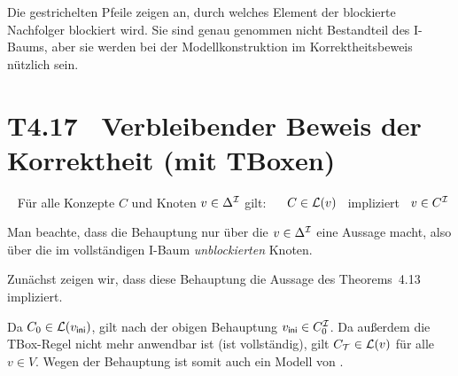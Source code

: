 \documentclass[fontsize=11pt, twoside=false, numbers=autoenddot]{scrbook}
\begin{document}
Die gestrichelten Pfeile zeigen an, durch welches Element der blockierte Nachfolger
blockiert wird.
Sie sind genau genommen nicht Bestandteil des I-Baums, aber sie werden
bei der Modellkonstruktion im Korrektheitsbeweis nützlich sein.

\section*{T4.17~ Verbleibender Beweis der Korrektheit (mit TBoxen)}

~
Für alle Konzepte $C$ und Knoten $v \in \Delta^\mathcal{I}$ gilt:
~~
$C \in \mathcal{L}(v)$
~impliziert~
$v \in C^\mathcal{I}$

\parII
Man beachte, dass die Behauptung nur über die $v \in \Delta^\mathcal{I}$
eine Aussage macht, also über die im vollständigen I-Baum \Bmc \emph{unblockierten} Knoten.

\par\medskip
Zunächst zeigen wir, dass diese Behauptung die Aussage
des Theorems~4.13 impliziert.

Da $C_0 \in \mathcal{L}(v_{\textsf{ini}})$,
gilt nach der obigen Behauptung $v_{\textsf{ini}} \in C_0^\mathcal{I}$.
Da außerdem die TBox-Regel nicht mehr anwendbar ist (\Bmc ist vollständig),
gilt $C_\mathcal{T} \in \mathcal{L}(v)$ für alle $v \in V$.
Wegen der Behauptung ist somit \Imc auch ein Modell von \Tmc.
\end{document}
